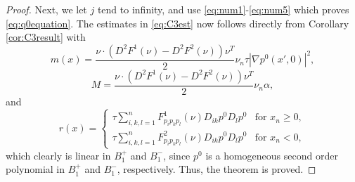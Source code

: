 \documentclass[10pt,a4paper]{amsart}
\begin{document}
\begin{proof}
Next, we let $j$ tend to infinity, and use \eqref{eq:num1}-\eqref{eq:num5} which proves \eqref{eq:q0equation}. The estimates in \eqref{eq:C3est} now follows directly from Corollary \ref{cor:C3result} with
$$
m(x)=  \frac{\nu \cdot (D^2 F^1 (\nu)-D^2 F^2(\nu)) \nu^T }{2}\nu_n\tau|\nabla p^0(x',0)|^2,
$$
$$
M =  \frac{\nu \cdot (D^2 F^1 (\nu)-D^2 F^2(\nu))\nu^T}{2} \nu_n \alpha,
$$
and
 $$
 r(x)=\left\{ \begin{array}{ll}
               \tau \sum_{i, k, l = 1}^n   F^1_{p_ip_k p_l}(\nu) D_{ik} p^0 D_l p^0  & \textrm{for }x_n\ge 0, \\
               \tau \sum_{i, k, l = 1}^n   F^2_{p_ip_k p_l}(\nu) D_{ik} p^0 D_l p^0 & \textrm{for }x_n<0,
              \end{array}
 \right.
 $$
which clearly is linear in $B_1^+$ and $B_1^-$, since $p^0$ is a homogeneous second order polynomial in $B_1^+$ and $B_1^-$, respectively. Thus, the theorem is proved.
\end{proof}
\end{document}
